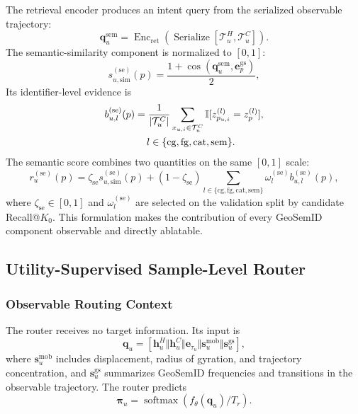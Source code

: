 \documentclass[journal]{IEEEtran}
\newcommand{\Ind}{\mathbb{I}}
\begin{document}
The retrieval encoder produces an intent query from the serialized observable
trajectory:
\begin{equation}
\bm{q}_{u}^{\mathrm{sem}}
=
\operatorname{Enc}_{\mathrm{ret}}
\left(
\operatorname{Serialize}
\left[\mathcal{T}_{u}^{H},\mathcal{T}_{u}^{C}\right]
\right).
\label{eq:semantic_query}
\end{equation}
The semantic-similarity component is normalized to $[0,1]$:
\begin{equation}
s_{u,\mathrm{sim}}^{(\mathrm{se})}(p)
=
\frac{1+\operatorname{cos}\!\left(
\bm{q}_{u}^{\mathrm{sem}},\bm{e}_{p}^{\mathrm{gs}}
\right)}{2},
\label{eq:semantic_exact}
\end{equation}
Its identifier-level evidence is
\begin{equation}
\begin{aligned}
b_{u,l}^{(\mathrm{se})}(p)
&=
\frac{1}{|\mathcal{T}_{u}^{C}|}
\sum_{x_{u,i}\in\mathcal{T}_{u}^{C}}
\Ind[z_{p_{u,i}}^{(l)}=z_p^{(l)}],\\
&\hspace{1.2em}
 l\in\{\mathrm{cg},\mathrm{fg},\mathrm{cat},\mathrm{sem}\}.
\end{aligned}
\label{eq:semantic_backoff}
\end{equation}
The semantic score combines two quantities on the same $[0,1]$ scale:
\begin{equation}
r_u^{(\mathrm{se})}(p)
=
\zeta_{\mathrm{se}}s_{u,\mathrm{sim}}^{(\mathrm{se})}(p)
+
(1-\zeta_{\mathrm{se}})
\sum_{l\in\{\mathrm{cg},\mathrm{fg},\mathrm{cat},\mathrm{sem}\}}
\omega_l^{(\mathrm{se})}b_{u,l}^{(\mathrm{se})}(p),
\label{eq:semantic_fusion}
\end{equation}
where $\zeta_{\mathrm{se}}\in[0,1]$ and $\omega_l^{(\mathrm{se})}$ are selected
on the validation split by candidate Recall@$K_0$. This formulation makes the
contribution of every GeoSemID component observable and directly ablatable.

\subsection{Utility-Supervised Sample-Level Router}
\label{subsec:router}

\subsubsection{Observable Routing Context}

The router receives no target information.
Its input is
\begin{equation}
\bm{q}_{u}
=
[
\bm{h}_{u}^{H}
\Vert
\bm{h}_{u}^{C}
\Vert
\bm{e}_{\tau_u}
\Vert
\bm{s}_{u}^{\mathrm{mob}}
\Vert
\bm{s}_{u}^{\mathrm{gs}}
],
\label{eq:routing_context}
\end{equation}
where $\bm{s}_{u}^{\mathrm{mob}}$ includes displacement, radius of gyration,
and trajectory concentration, and $\bm{s}_{u}^{\mathrm{gs}}$ summarizes
GeoSemID frequencies and transitions in the observable trajectory.
The router predicts
\begin{equation}
\bm{\pi}_{u}
=
\operatorname{softmax}(f_{\theta}(\bm{q}_{u})/T_r).
\label{eq:router_output}
\end{equation}
\end{document}

